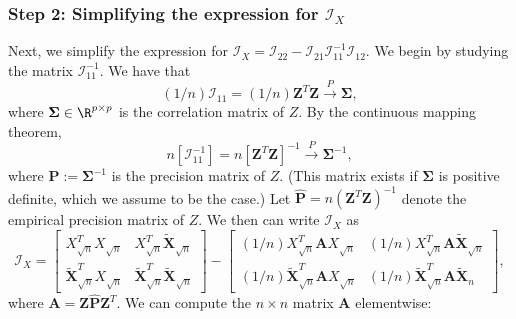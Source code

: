 \documentclass[12pt]{article}
\newcommand{\bs}[1]{\boldsymbol{#1}}
\newcommand{\infomat}{\bs{\mathcal{I}}}
\begin{document}
\subsubsection*{Step 2: Simplifying the expression for $\infomat_X$}

Next, we simplify the expression for $\infomat_X = \infomat_{22} - \infomat_{21} \infomat_{11}^{-1} \infomat_{12}$. We begin by studying the matrix $\infomat_{11}^{-1}.$ We have that
$$(1/n) \infomat_{11} = (1/n) \bs{Z}^T \bs{Z} \xrightarrow{P} \bs{\Sigma},$$ where $\bs{\Sigma} \in \R^{p \times p}$ is the correlation matrix of $Z$. By the continuous mapping theorem,
$$n \left[\infomat^{-1}_{11}\right] =  n[\bs{Z}^T \bs{Z}]^{-1} \xrightarrow{P} \bs{\Sigma}^{-1},$$ where $\bs{P} := \bs{\Sigma}^{-1}$ is the precision matrix of $Z$. (This matrix exists if $\bs{\Sigma}$ is positive definite, which we assume to be the case.) Let $\hat{\bs{P}} = n(\bs{Z}^T \bs{Z})^{-1} $ denote the empirical precision matrix of $Z$. We then can write $\infomat_X$ as
$$ \infomat_X = 
\begin{bmatrix}
X_{\sqrt{n}}^T X_{\sqrt{n}} & X_{\sqrt{n}}^T \tilde{\bs{X}}_{\sqrt{n}} \\ \tilde{\bs{X}}_{\sqrt{n}}^T X_{\sqrt{n}} & \tilde{\bs{X}}_{\sqrt{n}}^T \tilde{\bs{X}}_{\sqrt{n}} 
\end{bmatrix} -
\begin{bmatrix} (1/n) X_{\sqrt{n}}^T \bs{A} X_{\sqrt{n}} & (1/n) X_{\sqrt{n}}^T \bs{A} \tilde{\bs{X}}_{\sqrt{n}} \\ (1/n)\tilde{\bs{X}}_{\sqrt{n}}^T \bs{A}X_{\sqrt{n}} & (1/n)\tilde{\bs{X}}_{\sqrt{n}}^T\bs{A} \tilde{\bs{X}}_{{n}} \end{bmatrix},
$$
where $\bs{A} = \bs{Z}\hat{\bs{P}}\bs{Z}^T.$ We can compute the $n\times n$ matrix $\bs{A}$ elementwise:
\end{document}

